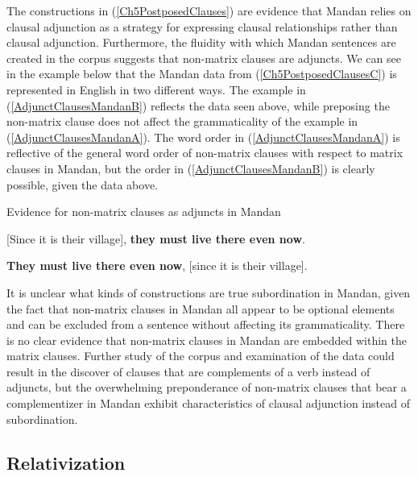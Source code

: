 The constructions in (\ref{Ch5PostposedClauses}) are evidence that Mandan relies on clausal adjunction as a strategy for expressing clausal relationships rather than clausal adjunction. Furthermore, the fluidity with which Mandan sentences are created in the corpus suggests that non-matrix clauses are adjuncts. We can see in the example below that the Mandan data from (\ref{Ch5PostposedClausesC}) is represented in English in two different ways. The example in (\ref{AdjunctClausesMandanB}) reflects the data seen above, while preposing the non-matrix clause does not affect the grammaticality of the example in (\ref{AdjunctClausesMandanA}). The word order in (\ref{AdjunctClausesMandanA}) is reflective of the general word order of non-matrix clauses with respect to matrix clauses in Mandan, but the order in (\ref{AdjunctClausesMandanB}) is clearly possible, given the data above.

\begin{exe}
    \item\label{AdjunctClausesMandan} Evidence for non-matrix clauses as adjuncts in Mandan

    \begin{xlist}
    \item\label{AdjunctClausesMandanA} {[}Since it is their village], \textbf{they must live there even now}.
    \item\label{AdjunctClausesMandanB} \textbf{They must live there even now}, {[}since it is their village].
    \end{xlist}
\end{exe}

It is unclear what kinds of constructions are true subordination in Mandan, given the fact that non-matrix clauses in Mandan all appear to be optional elements and can be excluded from a sentence without affecting its grammaticality. There is no clear evidence that non-matrix clauses in Mandan are embedded within the matrix clauses. Further study of the corpus and examination of the data could result in the discover of clauses that are complements of a verb instead of adjuncts, but the overwhelming preponderance of non-matrix clauses that bear a complementizer in Mandan exhibit characteristics of clausal adjunction instead of subordination.


\subsection{Relativization}\label{Ch5Relativization}

